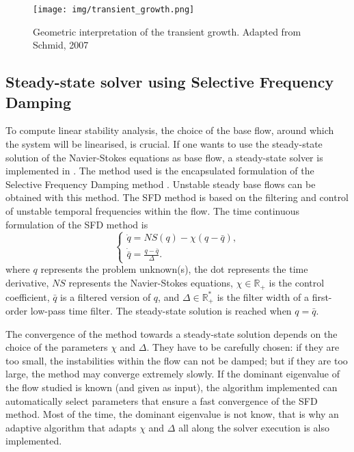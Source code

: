 \begin{figure}[!htbp]
\centering
 \label{TG}
 {\texttt{[image: img/transient\_growth.png]}}
   \caption {Geometric interpretation of the transient growth. Adapted from Schmid, 2007 }
\end{figure}


\subsection{Steady-state solver using Selective Frequency Damping}
\label{SectionSFD}

To compute linear stability analysis, the choice of the base flow,
around which the system will be linearised, is crucial. If one wants
to use the steady-state solution of the Navier-Stokes equations as
base flow, a steady-state solver is implemented in \nekpp. The method
used is the encapsulated formulation of the Selective Frequency
Damping method \cite{JoCoSh14}. Unstable steady base flows can be
obtained with this method. The SFD method is based on the filtering
and control of unstable temporal frequencies within the flow. The time
continuous formulation of the SFD method is
\begin{equation}
\begin{cases}
\dot{q}=NS(q)-\chi (q-\bar{q}), \\
\dot{\bar{q}}=\frac{q-\bar{q}}{\Delta}.
\end{cases}
\label{SFD-General}
\end{equation}
where $q$ represents the problem unknown(s), the dot represents the time derivative, $NS$ represents the Navier-Stokes equations, $\chi \in \mathbb{R}_+$ is the control coefficient, $\bar{q}$ is a filtered version of $q$, and $\Delta \in \mathbb{R}_+ ^*$ is the filter width of a first-order low-pass time filter. The steady-state solution is reached when $q=\bar{q}$.

The convergence of the method towards a steady-state solution depends on the choice of the parameters $\chi$ and $\Delta$. They have to be carefully chosen: if they are too small, the instabilities within the flow can not be damped; but if they are too large, the method may converge extremely slowly. If the dominant eigenvalue of the flow studied is known (and given as input), the algorithm implemented can automatically select parameters that ensure a fast convergence of the SFD method. Most of the time, the dominant eigenvalue is not know, that is why an adaptive algorithm that adapts $\chi$ and $\Delta$ all along the solver execution is also implemented.

